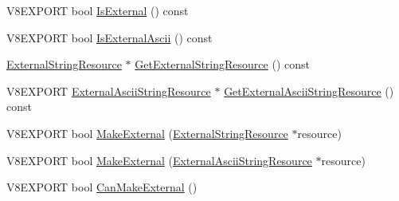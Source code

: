 \begin{DoxyCompactItemize}
\item 
V8\+E\+X\+P\+O\+R\+T bool \hyperlink{classv8_1_1_string_a945ba040efb2bffb14c04eda492767ac}{Is\+External} () const 
\item 
V8\+E\+X\+P\+O\+R\+T bool \hyperlink{classv8_1_1_string_a1b136ebc0ac30df9357e09b5486ca0a3}{Is\+External\+Ascii} () const 
\item 
\hyperlink{classv8_1_1_string_1_1_external_string_resource}{External\+String\+Resource} $\ast$ \hyperlink{classv8_1_1_string_a1a78c6fe39dbdd6322ca576e224f0cba}{Get\+External\+String\+Resource} () const 
\item 
V8\+E\+X\+P\+O\+R\+T \hyperlink{classv8_1_1_string_1_1_external_ascii_string_resource}{External\+Ascii\+String\+Resource} $\ast$ \hyperlink{classv8_1_1_string_a4b1245ec290ee25ee64c803fc85693d7}{Get\+External\+Ascii\+String\+Resource} () const 
\item 
V8\+E\+X\+P\+O\+R\+T bool \hyperlink{classv8_1_1_string_a6419e6b87e73bf03e326dd862fdca495}{Make\+External} (\hyperlink{classv8_1_1_string_1_1_external_string_resource}{External\+String\+Resource} $\ast$resource)
\item 
V8\+E\+X\+P\+O\+R\+T bool \hyperlink{classv8_1_1_string_ad1970efe9119a63f667c4acbdccda424}{Make\+External} (\hyperlink{classv8_1_1_string_1_1_external_ascii_string_resource}{External\+Ascii\+String\+Resource} $\ast$resource)
\item 
V8\+E\+X\+P\+O\+R\+T bool \hyperlink{classv8_1_1_string_ac24779f37e73d8af36092cca294804c3}{Can\+Make\+External} ()
\end{DoxyCompactItemize}
